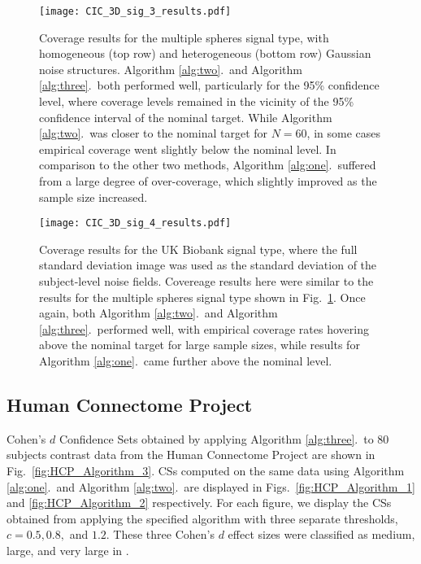 \begin{figure}[!htbp]
\hspace*{-3.0cm}
\centering
    \texttt{[image: CIC\_3D\_sig\_3\_results.pdf]}
\caption{Coverage results for the multiple spheres signal type, with homogeneous (top row) and heterogeneous (bottom row) Gaussian noise structures. Algorithm \ref{alg:two}.\ and Algorithm \ref{alg:three}.\ both performed well, particularly for the 95\% confidence level, where coverage levels remained in the vicinity of the 95\% confidence interval of the nominal target. While Algorithm \ref{alg:two}.\ was closer to the nominal target for $N = 60$, in some cases empirical coverage went slightly below the nominal level. In comparison to the other two methods, Algorithm \ref{alg:one}.\ suffered from a large degree of over-coverage, which slightly improved as the sample size increased.}
\label{fig:Cohen_3D_sig_3_results}
\end{figure}

\begin{figure}[!htbp]
\hspace*{-3.0cm}
\centering
    \texttt{[image: CIC\_3D\_sig\_4\_results.pdf]}
\caption{Coverage results for the UK Biobank signal type, where the full standard deviation image was used as the standard deviation of the subject-level noise fields. Covereage results here were similar to the results for the multiple spheres signal type shown in Fig.\ \ref{fig:Cohen_3D_sig_3_results}. Once again, both Algorithm \ref{alg:two}.\ and Algorithm \ref{alg:three}.\ performed well, with empirical coverage rates hovering above the nominal target for large sample sizes, while results for Algorithm \ref{alg:one}.\ came further above the nominal level.}
\label{fig:Cohen_3D_sig_4_results}
\end{figure}

\clearpage

\subsection{Human Connectome Project} 
Cohen's $d$ Confidence Sets obtained by applying Algorithm \ref{alg:three}.\ to 80 subjects contrast data from the Human Connectome Project are shown in Fig.\ \ref{fig:HCP_Algorithm_3}. CSs computed on the same data using Algorithm \ref{alg:one}.\ and Algorithm \ref{alg:two}.\ are displayed in Figs.\ \ref{fig:HCP_Algorithm_1} and \ref{fig:HCP_Algorithm_2} respectively. For each figure, we display the CSs obtained from applying the specified algorithm with three separate thresholds, $c= 0.5, 0.8,$ and $1.2$. These three Cohen's $d$ effect sizes were classified as medium, large, and very large in \textit{\citet*{Cohen2013-it}}.

